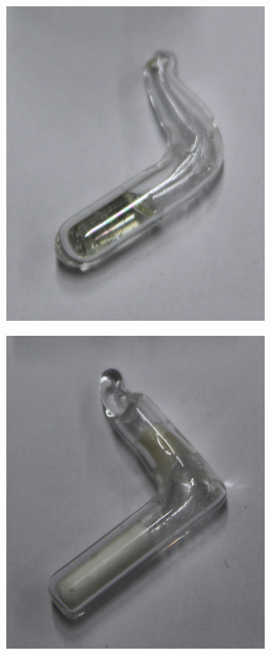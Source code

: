 \begin{figure}[H]
	\centering
	\begin{subfigure}{.24\textwidth}
		\centering
		\includegraphics[width=0.95\textwidth]{graphics/proben/CRN_zuern.jpg}
		\caption{ }
		\label{fig:exp:probe_a}
	\end{subfigure}%
	\begin{subfigure}{.24\textwidth}
		\centering
		\includegraphics[width=0.95\textwidth]{graphics/proben/CRN_alt.jpg}

\end{subfigure}
\end{figure}
